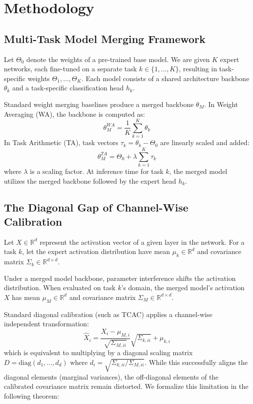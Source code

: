\documentclass{article}
\theoremstyle{plain}
\theoremstyle{definition}
\theoremstyle{remark}
\begin{document}
\section{Methodology}
\label{sec:method}

\subsection{Multi-Task Model Merging Framework}
Let $\Theta_0$ denote the weights of a pre-trained base model. We are given $K$ expert networks, each fine-tuned on a separate task $k \in \{1, \dots, K\}$, resulting in task-specific weights $\Theta_1, \dots, \Theta_K$. Each model consists of a shared architecture backbone $\theta_k$ and a task-specific classification head $h_k$.

Standard weight merging baselines produce a merged backbone $\theta_M$. In Weight Averaging (WA), the backbone is computed as:
\begin{equation}
  \theta_M^{WA} = \frac{1}{K} \sum_{k=1}^K \theta_k
\end{equation}
In Task Arithmetic (TA), task vectors $\tau_k = \theta_k - \Theta_0$ are linearly scaled and added:
\begin{equation}
  \theta_M^{TA} = \Theta_0 + \lambda \sum_{k=1}^K \tau_k
\end{equation}
where $\lambda$ is a scaling factor. At inference time for task $k$, the merged model utilizes the merged backbone followed by the expert head $h_k$.

\subsection{The Diagonal Gap of Channel-Wise Calibration}
Let $X \in \mathbb{R}^d$ represent the activation vector of a given layer in the network. For a task $k$, let the expert activation distribution have mean $\mu_k \in \mathbb{R}^d$ and covariance matrix $\Sigma_k \in \mathbb{R}^{d \times d}$. 

Under a merged model backbone, parameter interference shifts the activation distribution. When evaluated on task $k$'s domain, the merged model's activation $X$ has mean $\mu_M \in \mathbb{R}^d$ and covariance matrix $\Sigma_M \in \mathbb{R}^{d \times d}$.

Standard diagonal calibration (such as TCAC) applies a channel-wise independent transformation:
\begin{equation}
  \hat{X}_i = \frac{X_i - \mu_{M,i}}{\sqrt{\Sigma_{M,ii}}} \sqrt{\Sigma_{k,ii}} + \mu_{k,i}
\end{equation}
which is equivalent to multiplying by a diagonal scaling matrix $D = \text{diag}(d_1, \dots, d_d)$ where $d_i = \sqrt{\Sigma_{k,ii}/\Sigma_{M,ii}}$. While this successfully aligns the diagonal elements (marginal variances), the off-diagonal elements of the calibrated covariance matrix remain distorted. We formalize this limitation in the following theorem:
\end{document}
